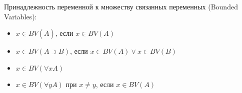 Принадлежность переменной к множеству связанных переменных (Bounded Variables):
\begin{itemize}
    \item $x\in BV(\overline{A})$, если $x \in BV(A)$
    \item $x \in BV(A\supset B)$, если $x\in BV(A) \lor x\in BV(B)$
    \item $x \in BV(\forall x A)$
    \item $x \in BV(\forall y A)$ при $x\ne y$, если $x \in BV(A)$
\end{itemize}
